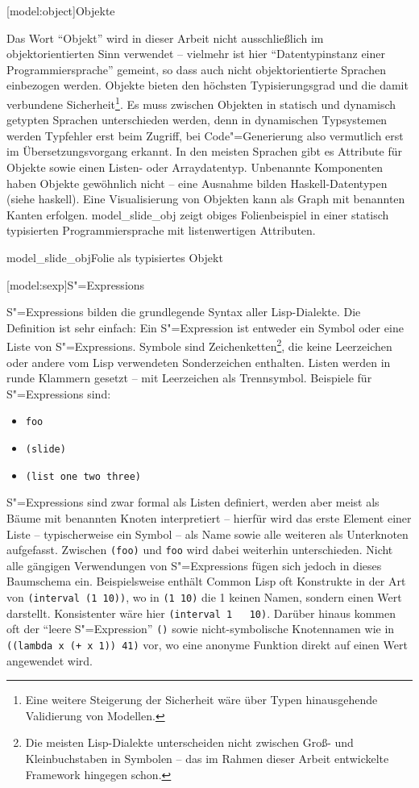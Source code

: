 \documentclass[11pt, a4paper, bibgerm]{scrbook}
\newcommand\icode[1]{\lstinline?#1?}
\newcommand\lsection{}
\newcommand\sref{}
\newcommand\abb{}
\newcommand\fig{}
\newcommand{\sees}[1]{(siehe \sref{#1})}
\newcommand{\sexp}{S"=Expression}
\newcommand{\sexps}{S"=Expressions}
\newcommand{\cgen}{Code"=Generierung}
\begin{document}
\lsection[model:object]{Objekte}

Das Wort ``Objekt'' wird in dieser Arbeit nicht ausschließlich im
objektorientierten Sinn verwendet -- vielmehr ist hier "`Datentypinstanz
einer Programmiersprache"' gemeint, so dass auch nicht objektorientierte
Sprachen einbezogen werden. Objekte bieten den höchsten Typisierungsgrad
und die damit verbundene Sicherheit\footnote{Eine weitere Steigerung der
  Sicherheit wäre über Typen hinausgehende Validierung von
  Modellen.}. Es muss zwischen Objekten in statisch und dynamisch
getypten Sprachen unterschieden werden, denn in dynamischen Typsystemen
werden Typfehler erst beim Zugriff, bei \cgen{} also vermutlich erst im
Übersetzungsvorgang erkannt. In den meisten Sprachen gibt es Attribute
für Objekte sowie einen Listen- oder Arraydatentyp. Unbenannte
Komponenten haben Objekte gewöhnlich nicht -- eine Ausnahme bilden
Haskell-Datentypen \sees{haskell}. Eine Visualisierung von Objekten kann
als Graph mit benannten Kanten erfolgen. \abb{model_slide_obj} zeigt
obiges Folienbeispiel in einer statisch typisierten Programmiersprache
mit listenwertigen Attributen.

\fig{model_slide_obj}{Folie als typisiertes Objekt}

\lsection[model:sexp]{\sexps}

\sexps{} bilden die grundlegende Syntax aller Lisp-Dialekte. Die
Definition ist sehr einfach: Ein \sexp{} ist entweder ein Symbol oder
eine Liste von \sexps{}. Symbole sind Zeichenketten\footnote{Die meisten
  Lisp-Dialekte unterscheiden nicht zwischen Groß- und Kleinbuchstaben
  in Symbolen -- das im Rahmen dieser Arbeit entwickelte Framework
  hingegen schon.}, die keine Leerzeichen oder andere vom Lisp
verwendeten Sonderzeichen enthalten. Listen werden in runde Klammern
gesetzt -- mit Leerzeichen als Trennsymbol. Beispiele für \sexps{} sind:
\begin{itemize}
\item \icode{foo}
\item \icode{(slide)}
\item \icode{(list one two three)}
\end{itemize}

\sexps{} sind zwar formal als Listen definiert, werden aber meist als
Bäume mit benannten Knoten interpretiert -- hierfür wird das erste
Element einer Liste -- typischerweise ein Symbol -- als Name sowie alle
weiteren als Unterknoten aufgefasst. Zwischen \icode{(foo)} und
\icode{foo} wird dabei weiterhin unterschieden. Nicht alle gängigen
Verwendungen von \sexps{} fügen sich jedoch in dieses Baumschema
ein. Beispielsweise enthält Common Lisp oft Konstrukte in der Art von
\icode{(interval (1 10))}, wo in \icode{(1 10)} die 1 keinen Namen,
sondern einen Wert darstellt. Konsistenter wäre hier \icode{(interval 1
  10)}. Darüber hinaus kommen oft der ``leere \sexp{}'' \icode{()} sowie
nicht-symbolische Knotennamen wie in \icode{((lambda x (+ x 1)) 41)}
vor, wo eine anonyme Funktion direkt auf einen Wert angewendet wird.
\end{document}
